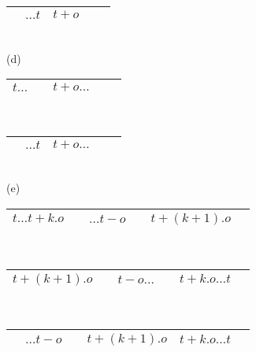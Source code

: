 \begin{minipage}[t]{0.5\textwidth}
\begin{center}
\begin{tabular}{ |c|c|c|c|c| }
 \hline 
 \hspace*{1cm} & $\ldots t$ & $t + o$ & \hspace*{2cm} \\ 
 \hline
\end{tabular}
\\
(d)
\\[0.1in]
\begin{tabular}{ |c|c|c|c|c| }
 \hline 
 $t \dots$ & \hspace*{1cm} & $t + o \ldots$ & \hspace*{2cm} \\ 
 \hline
\end{tabular}
\\ 
\begin{tabular}{ |c|c|c|c|c| }
 \hline 
 \hspace*{1cm} & $\dots t$ & $t + o \ldots$ & \hspace*{2cm} \\ 
 \hline
\end{tabular}
\\
(e)
\\[0.1in]
\begin{tabular}{ |c|c|c|c|c|c| }
 \hline 
 $t \ldots t+k.o$ & \hspace*{0.1cm} & $\ldots t - o$ & \hspace*{0.1cm} & $t+(k+1).o$  & \hspace{0.1cm} \\ 
 \hline
\end{tabular}\\
\begin{tabular}{ |c|c|c|c|c|c| }
 \hline 
 $t+(k+1).o$ & \hspace*{0.1cm} & $t - o \ldots$ & \hspace*{0.1cm} & $t+k.o \ldots t$  & \hspace{0.1cm} \\ 
 \hline
\end{tabular}\\
\begin{tabular}{ |c|c|c|c|c|c| }
 \hline 
 \hspace*{0.1cm} & $\ldots t - o$ & \hspace*{0.1cm} & $t+(k+1).o$  & $t+k.o \ldots t$ & \hspace{0.1cm} \\ 
 \hline
\end{tabular}\\
\begin{tabular}{ |c|c|c|c|c|c| }

\end{tabular}
\end{center}
\end{minipage}
